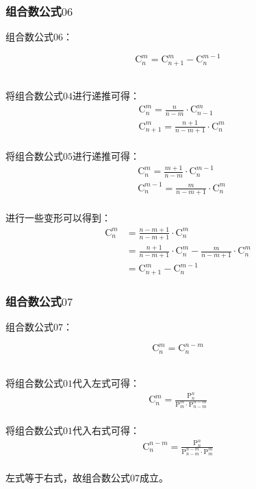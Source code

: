 \documentclass[UTF8]{ctexart}
\begin{document}
\subsubsection{组合数公式$06$}
    组合数公式$06$：
    \begin{large}
        \begin{equation*}
            \mathrm{C}_n^m=\mathrm{C}_{n+1}^m-\mathrm{C}_n^{m-1}
        \end{equation*}
    \end{large}\\
    将组合数公式$04$进行递推可得：
    \setcounter{equation}{0}
    \begin{align}
        &\mathrm{C}_n^m=\frac{n}{n-m}\cdot\mathrm{C}_{n-1}^m\\[3mm]
        &\mathrm{C}_{n+1}^m=\frac{n+1}{n-m+1}\cdot\mathrm{C}_{n}^m
    \end{align}\\
    将组合数公式$05$进行递推可得：
    \begin{align}
        &\mathrm{C}_n^m=\frac{m+1}{n-m}\cdot\mathrm{C}_n^{m-1}\\[3mm]
        &\mathrm{C}_n^{m-1}=\frac{m}{n-m+1}\cdot\mathrm{C}_n^{m}
    \end{align}\\
    进行一些变形可以得到：
    \begin{align}
        \mathrm{C}_n^m
        &=\frac{n-m+1}{n-m+1}\cdot\mathrm{C}_n^m\\[3mm]
        &=\frac{n+1}{n-m+1}\cdot\mathrm{C}_n^m-\frac{m}{n-m+1}\cdot\mathrm{C}_n^m\\[3mm]
        &=\mathrm{C}_{n+1}^m-\mathrm{C}_n^{m-1}
    \end{align}

\newpage

\subsubsection{组合数公式$07$}
    组合数公式$07$：
    \begin{large}
        \begin{equation*}
            \mathrm{C}_n^m=\mathrm{C}_n^{n-m}
        \end{equation*}
    \end{large}\\
    将组合数公式$01$代入左式可得：
    \setcounter{equation}{0}
    \begin{align}
        \mathrm{C}_n^m=\frac{\mathrm{P}_n^n}{\mathrm{P}_m^m\cdot\mathrm{P}_{n-m}^{n-m}}
    \end{align}\\
    将组合数公式$01$代入右式可得：
    \begin{align}
        \mathrm{C}_n^{n-m}=\frac{\mathrm{P}_n^n}{\mathrm{P}_{n-m}^{n-m}\cdot\mathrm{P}_m^m}
    \end{align}\\
    左式等于右式，故组合数公式$07$成立。
\end{document}
